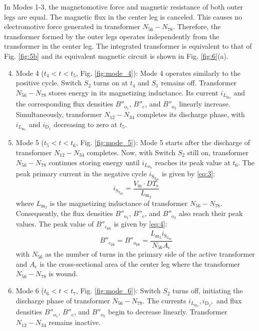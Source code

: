 \documentclass[lettersize,journal]{IEEEtran}
\begin{document}
In Modes 1-3, the magnetomotive force and magnetic resistance of both outer legs are equal. The magnetic flux in the center leg is canceled. This causes no electromotive force generated in transformer $N_{56}-N_{78}$. Therefore, the transformer formed by the outer legs operates independently from the transformer in the center leg. The integrated transformer is equivalent to that of Fig. \ref{fig:5b} and its equivalent magnetic circuit is shown in Fig. \ref{fig:6}(a).

\begin{enumerate}
    \setcounter{enumi}{3} %
    \item Mode 4 ($t_4 < t < t_5$, Fig. \ref{fig:mode_4}): Mode 4 operates similarly to the positive cycle. Switch $S_2$ turns on at $t_4$ and $S_1$ remains off. Transformer $N_{56}-N_{78}$ stores energy in its magnetizing inductance. Its current $i_{L_{\mathrm{m}_2}}$ and the corresponding flux densities $B''_{\mathrm{o}_1}$, $B''_{\mathrm{c}}$, and $B''_{\mathrm{o}_2}$ linearly increase. Simultaneously, transformer $N_{12}-N_{34}$ completes its discharge phase, with $i_{L_{\mathrm{m}_1}}$ and $i_{\mathrm{D}_1}$ decreasing to zero at $t_5$.

    \item Mode 5 ($t_5 < t < t_6$, Fig. \ref{fig:mode_5}): Mode 5 starts after the discharge of transformer $N_{12}-N_{34}$ completes. Now, with Switch $S_2$ still on, transformer $N_{56}-N_{78}$ continues storing energy until $i_{L_{\mathrm{m}_2}}$ reaches its peak value at $t_6$. The peak primary current in the negative cycle $i_{\mathrm{S}_{2_{\mathrm{pk}}}}$ is given by \eqref{eq:3}:
    \begin{equation}
    \label{eq:3}
    i_{\mathrm{S}_{2_{\mathrm{pk}}}} = \frac{V_{\mathrm{in}} \cdot DT_{\mathrm{s}}}{L_{\mathrm{m}_2}}
    \end{equation}
    where $L_{\mathrm{m}_2}$ is the magnetizing inductance of transformer $N_{56}-N_{78}$. Consequently, the flux densities $B''_{\mathrm{o}_1}$, $B''_{\mathrm{c}}$, and $B''_{\mathrm{o}_2}$ also reach their peak values. The peak value of $B''_{\mathrm{c}_{\mathrm{pk}}}$ is given by \eqref{eq:4}:
    \begin{equation}
    \label{eq:4}
    B''_{\mathrm{c}_{\mathrm{pk}}} = B''_{\mathrm{o}_{\mathrm{pk}}} = \frac{L_{\mathrm{m}_2} i_{\mathrm{S}_{2_{\mathrm{pk}}}}}{N_{56} A_{\mathrm{c}}}
    \end{equation}
    with $N_{56}$ as the number of turns in the primary side of the active transformer and $A_{\mathrm{c}}$ is the cross-sectional area of the center leg where the transformer $N_{56}-N_{78}$ is wound.

    \item Mode 6 ($t_6 < t < t_7$, Fig. \ref{fig:mode_6}): Switch $S_2$ turns off, initiating the discharge phase of transformer $N_{56}-N_{78}$. The currents $i_{L_{\mathrm{m}_2}}, i_{\mathrm{D}_2},$ and flux densities $B''_{\mathrm{o}_1}$, $B''_{\mathrm{c}}$, and $B''_{\mathrm{o}_2}$ begin to decrease linearly. Transformer $N_{12}-N_{34}$ remains inactive.
\end{enumerate}
\end{document}
